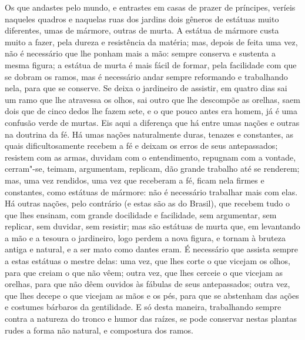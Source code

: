 Os que andastes pelo mundo, e entrastes em casas de prazer de príncipes,
veríeis naqueles quadros e naquelas ruas dos jardins dois gêneros de
estátuas muito diferentes, umas de mármore, outras de murta. A estátua de mármore
custa muito a fazer, pela dureza e resistência da matéria; mas, depois
de feita uma vez, não é necessário que lhe ponham mais a mão: sempre
conserva e sustenta a mesma figura; a estátua de murta é mais fácil de
formar, pela facilidade com que se dobram os ramos, mas é necessário
andar sempre reformando e trabalhando nela, para que se conserve. Se
deixa o jardineiro de assistir, em quatro dias sai um ramo que lhe
atravessa os olhos, sai outro que lhe descompõe as orelhas, saem dois
que de cinco dedos lhe fazem sete, e o que pouco antes era homem, já é
uma confusão verde de murtas. Eis aqui a diferença que há entre umas
nações e outras na doutrina da fé. Há umas nações naturalmente duras,
tenazes e constantes, as quais dificultosamente recebem a fé e deixam os
erros de seus antepassados; resistem com as armas, duvidam com o
entendimento, repugnam com a vontade, cerram"-se, teimam, argumentam,
replicam, dão grande trabalho até se renderem; mas, uma vez rendidos,
uma vez que receberam a fé, ficam nela firmes e constantes, como
estátuas de mármore: não é necessário trabalhar mais com elas. Há outras
nações, pelo contrário (e estas são as do Brasil), que recebem
tudo o que lhes ensinam, com grande docilidade e facilidade, sem
argumentar, sem replicar, sem duvidar, sem resistir; mas são estátuas de
murta que, em levantando a mão e a tesoura o jardineiro, logo perdem a
nova figura, e tornam à bruteza antiga e natural, e a ser mato como
dantes eram. É necessário que assista sempre a estas estátuas o mestre
delas: uma vez, que lhes corte o que vicejam os olhos, para que creiam o
que não vêem; outra vez, que lhes cerceie o que vicejam as orelhas, para
que não dêem ouvidos às fábulas de seus antepassados; outra vez, que
lhes decepe o que vicejam as mãos e os pés, para que se abstenham das
ações e costumes bárbaros da gentilidade. E só desta maneira,
trabalhando sempre contra a natureza do tronco e humor das raízes, se
pode conservar nestas plantas rudes a forma não natural, e compostura
dos ramos.

